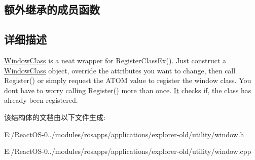 \subsection*{额外继承的成员函数}


\subsection{详细描述}
\hyperlink{struct_window_class}{Window\+Class} is a neat wrapper for Register\+Class\+Ex(). Just construct a \hyperlink{struct_window_class}{Window\+Class} object, override the attributes you want to change, then call Register() or simply request the A\+T\+OM value to register the window class. You don\textquotesingle{}t have to worry calling Register() more than once. \hyperlink{class_it}{It} checks if, the class has already been registered. 

该结构体的文档由以下文件生成\+:\begin{DoxyCompactItemize}
\item 
E\+:/\+React\+O\+S-\/0../modules/rosapps/applications/explorer-\/old/utility/window.\+h\item 
E\+:/\+React\+O\+S-\/0../modules/rosapps/applications/explorer-\/old/utility/window.\+cpp\end{DoxyCompactItemize}
